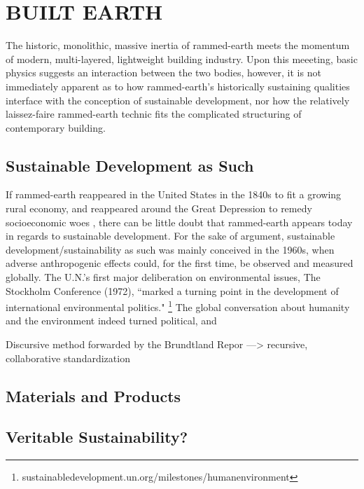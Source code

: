 \section{BUILT EARTH}

The historic, monolithic, massive inertia of rammed-earth meets the momentum of modern, multi-layered, lightweight building industry. Upon this meeeting, basic physics suggests an interaction between the two bodies, however, it is not immediately apparent as to how rammed-earth's historically sustaining qualities interface with the conception of sustainable development, nor how the relatively laissez-faire rammed-earth technic fits the complicated structuring of contemporary building.

\subsection{Sustainable Development as Such}
If rammed-earth reappeared in the United States in the 1840s to fit a growing rural economy, and reappeared around the Great Depression to remedy socioeconomic woes \cite{RAMMEDEARTHHOUSE}, there can be little doubt that rammed-earth appears today in regards to sustainable development. For the sake of argument, sustainable development/sustainability as such was mainly conceived in the 1960s, when adverse anthropogenic effects could, for the first time, be observed and measured globally. \cite{ORIGINSOFSUS} The U.N.'s first major deliberation on environmental issues, The Stockholm Conference (1972), ``marked a turning point in the development of international environmental politics." \footnote{sustainabledevelopment.un.org/milestones/humanenvironment} The global conversation about humanity and the environment indeed turned political, and

Discursive method forwarded by the Brundtland Repor ---> recursive, collaborative standardization



\subsection{Materials and Products}
%
%



\subsection{Veritable Sustainability?}
